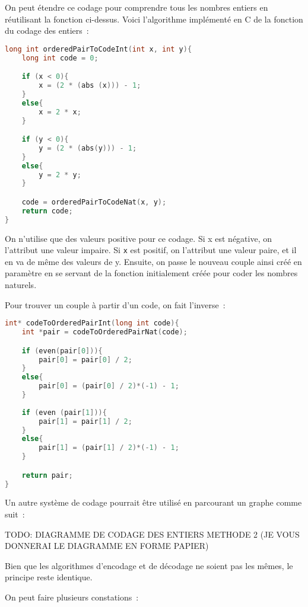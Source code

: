 \documentclass{article}
\begin{document}
On peut étendre ce codage pour comprendre tous les nombres entiers en réutilisant la fonction ci-dessus. Voici l'algorithme implémenté en C de la fonction du codage des entiers~:

\begin{lstlisting}[language=C]
long int orderedPairToCodeInt(int x, int y){
	long int code = 0;	

	if (x < 0){
		x = (2 * (abs (x))) - 1;
	}
	else{
		x = 2 * x;
	}

	if (y < 0){
		y = (2 * (abs(y))) - 1;
	}
	else{
		y = 2 * y;
	}

	code = orderedPairToCodeNat(x, y);
	return code;
}
\end{lstlisting}


On n'utilise que des valeurs positive pour ce codage. Si x est négative, on l'attribut une valeur impaire. Si \lstinline!x! est positif, on l'attribut une valeur paire, et il en va de même des valeurs de y. Ensuite, on passe le nouveau couple ainsi créé en paramètre en se servant de la fonction initialement créée pour coder les nombres naturels. 


Pour trouver un couple à partir d'un code, on fait l'inverse~:

\begin{lstlisting}[language=C]
int* codeToOrderedPairInt(long int code){
	int *pair = codeToOrderedPairNat(code);

	if (even(pair[0])){
		pair[0] = pair[0] / 2;
	}
	else{
		pair[0] = (pair[0] / 2)*(-1) - 1;
	} 
	
	if (even (pair[1])){
		pair[1] = pair[1] / 2;
	}
	else{
		pair[1] = (pair[1] / 2)*(-1) - 1;
	}

	return pair;
}
\end{lstlisting}  


Un autre système de codage pourrait être utilisé en parcourant un graphe comme suit~:

TODO: DIAGRAMME DE CODAGE DES ENTIERS METHODE 2 (JE VOUS DONNERAI LE DIAGRAMME EN FORME PAPIER) 

Bien que les algorithmes d'encodage et de décodage ne soient pas les mêmes, le principe reste identique. 

On peut faire plusieurs constations~:
\end{document}
